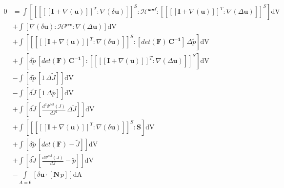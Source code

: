 \documentclass[preview,varwidth,multi,border=1pt]{standalone}
\begin{document}
\preview
$\begin{aligned}
0 &= \int\left[\left[\left[\left[\left[\mathbf{\mathbf{I}} + \nabla\left({\mathbf{u}}\right)\right]\right]^{T} \colon \nabla\left(\delta{\mathbf{u}}\right)\right]\right]^{S} \colon \mathcal{\mathcal{H}^{mat}} \colon \left[\left[\left[\left[\mathbf{\mathbf{I}} + \nabla\left({\mathbf{u}}\right)\right]\right]^{T} \colon \nabla\left(\Delta{\mathbf{u}}\right)\right]\right]^{S}\right]\textrm{dV} \\
  &+ \int\left[\nabla\left(\delta{\mathbf{u}}\right) \colon \mathcal{\mathcal{H}^{geo}} \colon \nabla\left(\Delta{\mathbf{u}}\right)\right]\textrm{dV} \\
  &+ \int\left[\left[\left[\left[\left[\mathbf{\mathbf{I}} + \nabla\left({\mathbf{u}}\right)\right]\right]^{T} \colon \nabla\left(\delta{\mathbf{u}}\right)\right]\right]^{S} \colon \left[{det(\mathbf{F})}\,\mathbf{\mathbf{C}^{-1}}\right]\,\Delta{\tilde{p}}\right]\textrm{dV} \\
  &+ \int\left[\delta{\tilde{p}}\,\left[{det(\mathbf{F})}\,\mathbf{\mathbf{C}^{-1}}\right] \colon \left[\left[\left[\left[\mathbf{\mathbf{I}} + \nabla\left({\mathbf{u}}\right)\right]\right]^{T} \colon \nabla\left(\Delta{\mathbf{u}}\right)\right]\right]^{S}\right]\textrm{dV} \\
  &- \int\left[\delta{\tilde{p}}\,\left[{1}\,\Delta{\tilde{J}}\right]\right]\textrm{dV} \\
  &- \int\left[\delta{\tilde{J}}\,\left[{1}\,\Delta{\tilde{p}}\right]\right]\textrm{dV} \\
  &+ \int\left[\delta{\tilde{J}}\,\left[{\frac{d^{2} \Psi^{vol}(J)}{dJ^{2}}}\,\Delta{\tilde{J}}\right]\right]\textrm{dV} \\
  &+ \int\left[\left[\left[\left[\left[\mathbf{\mathbf{I}} + \nabla\left({\mathbf{u}}\right)\right]\right]^{T} \colon \nabla\left(\delta{\mathbf{u}}\right)\right]\right]^{S} \colon \mathbf{\mathbf{S}}\right]\textrm{dV} \\
  &+ \int\left[\delta{\tilde{p}}\,\left[{det(\mathbf{F})} - {\tilde{J}}\right]\right]\textrm{dV} \\
  &+ \int\left[\delta{\tilde{J}}\,\left[{\frac{d \Psi^{vol}(J)}{dJ}} - {\tilde{p}}\right]\right]\textrm{dV} \\
  &- \int\limits_{A=6}\left[\delta{\mathbf{u}} \cdot \left[\mathbf{N}\,{p}\right]\right]\textrm{dA}
\end{aligned}$
\endpreview

\newpage
\end{document}
